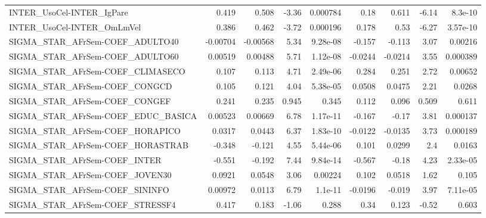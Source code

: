 \begin{tabular}{lrrrrrrrr}
INTER\_UsoCel-INTER\_IgPare             &       0.419 &        0.508 &   -3.36 & 0.000784 &       0.18 &       0.611 &        -6.14 &       8.3e-10 \\
INTER\_UsoCel-INTER\_OmLmVel            &       0.386 &        0.462 &   -3.72 & 0.000196 &      0.178 &        0.53 &        -6.27 &      3.57e-10 \\
SIGMA\_STAR\_AFrSem-COEF\_ADULTO40       &    -0.00704 &     -0.00568 &    5.34 & 9.28e-08 &     -0.157 &      -0.113 &         3.07 &       0.00216 \\
SIGMA\_STAR\_AFrSem-COEF\_ADULTO60       &     0.00519 &      0.00488 &    5.71 & 1.12e-08 &    -0.0244 &     -0.0214 &         3.55 &      0.000389 \\
SIGMA\_STAR\_AFrSem-COEF\_CLIMASECO      &       0.107 &        0.113 &    4.71 & 2.49e-06 &      0.284 &       0.251 &         2.72 &       0.00652 \\
SIGMA\_STAR\_AFrSem-COEF\_CONGCD         &       0.105 &        0.121 &    4.04 & 5.38e-05 &     0.0508 &      0.0475 &         2.21 &        0.0268 \\
SIGMA\_STAR\_AFrSem-COEF\_CONGEF         &       0.241 &        0.235 &   0.945 &    0.345 &      0.112 &       0.096 &        0.509 &         0.611 \\
SIGMA\_STAR\_AFrSem-COEF\_EDUC\_BASICA    &     0.00523 &      0.00669 &    6.78 & 1.17e-11 &     -0.167 &       -0.17 &         3.81 &      0.000137 \\
SIGMA\_STAR\_AFrSem-COEF\_HORAPICO       &      0.0317 &       0.0443 &    6.37 & 1.83e-10 &    -0.0122 &     -0.0135 &         3.73 &      0.000189 \\
SIGMA\_STAR\_AFrSem-COEF\_HORASTRAB      &      -0.348 &       -0.121 &    4.55 & 5.44e-06 &      0.101 &      0.0299 &          2.4 &        0.0163 \\
SIGMA\_STAR\_AFrSem-COEF\_INTER          &      -0.551 &       -0.192 &    7.44 & 9.84e-14 &     -0.567 &       -0.18 &         4.23 &      2.33e-05 \\
SIGMA\_STAR\_AFrSem-COEF\_JOVEN30        &      0.0921 &       0.0548 &    3.06 &  0.00224 &      0.102 &      0.0518 &         1.62 &         0.105 \\
SIGMA\_STAR\_AFrSem-COEF\_SININFO        &     0.00972 &       0.0113 &    6.79 &  1.1e-11 &    -0.0196 &      -0.019 &         3.97 &      7.11e-05 \\
SIGMA\_STAR\_AFrSem-COEF\_STRESSF4       &       0.417 &        0.183 &   -1.06 &    0.288 &       0.34 &       0.123 &        -0.52 &         0.603 \\

\end{tabular}
